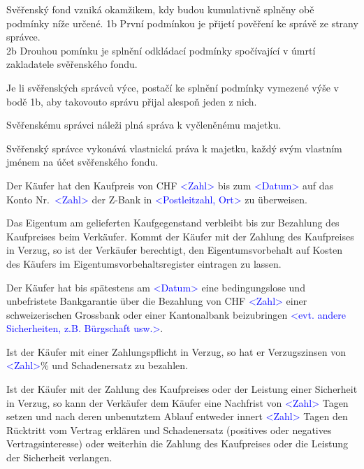 \documentclass[parskip=half]{scrreprt}
\begin{document}
\begin{contract}
Svěřenský fond vzniká okamžikem, kdy budou kumulativně splněny obě podmínky níže určené.
1b První podmínkou je přijetí pověření ke správě ze strany správce.\\
2b Drouhou pomínku je splnění odkládací podmínky spočívající v úmrtí zakladatele svěřenského fondu.


Je li svěřenských správců výce, postačí ke splnění podmínky vymezené výše v bodě 1b, aby takovouto správu přijal alespoň jeden z nich.



Svěřenskému správci náleži plná správa k vyčleněnému majetku.

Svěřenský správce vykonává vlastnická práva k majetku, každý svým vlastním jménem na účet svěřenského fondu.

Der Käufer hat den Kaufpreis von CHF \textcolor{blue}{<Zahl>} bis zum \textcolor{blue}{<Datum>} auf das Konto Nr.~\textcolor{blue}{<Zahl>} der Z-Bank in \textcolor{blue}{<Postleitzahl, Ort>} zu überweisen.

Das Eigentum am gelieferten Kaufgegenstand verbleibt bis zur Bezahlung des Kaufpreises beim Verkäufer. Kommt der Käufer mit der Zahlung des Kaufpreises in Verzug, so ist der Verkäufer berechtigt, den Eigentumsvorbehalt auf Kosten des Käufers im Eigentumsvorbehaltsregister eintragen zu lassen.

Der Käufer hat bis spätestens am \textcolor{blue}{<Datum>} eine bedingungslose und unbefristete Bankgarantie über die Bezahlung von CHF \textcolor{blue}{<Zahl>} einer schweizerischen Grossbank oder einer Kantonalbank beizubringen \textcolor{blue}{<evt. andere Sicherheiten, z.B. Bürgschaft usw.>}.

\parnumbertrue

Ist der Käufer mit einer Zahlungspflicht in Verzug, so hat er Verzugszinsen von \textcolor{blue}{<Zahl>}\% und Schadenersatz zu bezahlen.

Ist der Käufer mit der Zahlung des Kaufpreises oder der Leistung einer Sicherheit in Verzug, so kann der Verkäufer dem Käufer eine Nachfrist von \textcolor{blue}{<Zahl>} Tagen setzen und nach deren unbenutztem Ablauf entweder innert \textcolor{blue}{<Zahl>} Tagen den Rücktritt vom Vertrag erklären und Schadenersatz (positives oder negatives Vertragsinteresse) oder weiterhin die Zahlung des Kaufpreises oder die Leistung der Sicherheit verlangen.


\end{contract}
\end{document}
